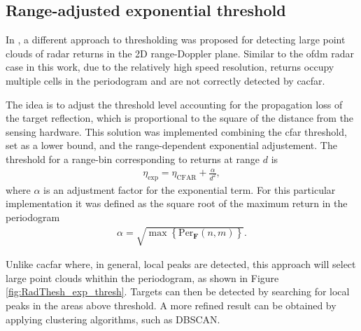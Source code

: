 \subsection{Range-adjusted exponential threshold}

	
	In \cite{Wagner_Feger_Stelzer_2017}, a different approach to thresholding was proposed for detecting large point clouds of radar returns in the 2D range-Doppler plane. Similar to the \gls{ofdm} radar case in this work, due to the relatively high speed resolution, returns occupy multiple cells in the periodogram and are not correctly detected by \gls{cacfar}.
	
	The idea is to adjust the threshold level accounting for the propagation loss of the target reflection, which is proportional to the square of the distance from the sensing hardware. 
	This solution was implemented combining the \gls{cfar} threshold, set as a lower bound, and the range-dependent exponential adjustement.
	The threshold for a range-bin corresponding to returns at range $d$ is
	\begin{align}
		\eta_{\text{exp}} = \eta_{\text{CFAR}} + \frac{\alpha}{d^2},
	\end{align} 
	where $\alpha$ is an adjustment factor for the exponential term. For this particular implementation it was defined as the square root of the maximum return in the periodogram
	\begin{align}
		\alpha = \sqrt{\max{ \left\{\text{Per}_{\mathbf F}(n,m)\right\} }}.
	\end{align}
	
	Unlike \gls{cacfar} where, in general, local peaks are detected, this approach will select large point clouds whithin the periodogram, as shown in Figure \ref{fig:RadThesh_exp_thresh}.
	Targets can then be detected by searching for local peaks in the areas above threshold. A more refined result can be obtained by applying clustering algorithms, such as DBSCAN.
	
